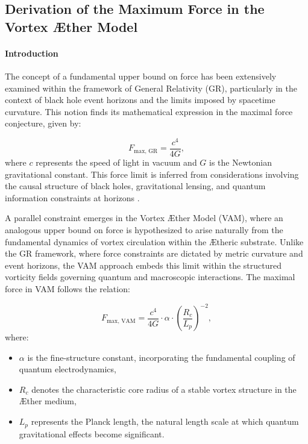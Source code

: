 
\subsection{Derivation of the Maximum Force in the Vortex \AE ther Model}

\paragraph*{Introduction}
The concept of a fundamental upper bound on force has been extensively examined within the framework of General Relativity (GR), particularly in the context of black hole event horizons and the limits imposed by spacetime curvature. This notion finds its mathematical expression in the maximal force conjecture, given by:


\begin{equation}
F_{\text{max, GR}} = \frac{c^4}{4G},
\end{equation}
where $c$ represents the speed of light in vacuum and $G$ is the Newtonian gravitational constant. This force limit is inferred from considerations involving the causal structure of black holes, gravitational lensing, and quantum information constraints at horizons \cite{Schiller2006}.


A parallel constraint emerges in the Vortex \AE ther Model (VAM), where an analogous upper bound on force is hypothesized to arise naturally from the fundamental dynamics of vortex circulation within the \AE theric substrate. Unlike the GR framework, where force constraints are dictated by metric curvature and event horizons, the VAM approach embeds this limit within the structured vorticity fields governing quantum and macroscopic interactions. The maximal force in VAM follows the relation:


\begin{equation}
F_{\text{max, VAM}} = \frac{c^4}{4G} \cdot \alpha \cdot \left(\frac{R_c}{L_p}\right)^{-2},
\end{equation}
where:
\begin{itemize}
\item $\alpha$ is the fine-structure constant, incorporating the fundamental coupling of quantum electrodynamics,
\item $R_c$ denotes the characteristic core radius of a stable vortex structure in the \AE ther medium,
\item $L_p$ represents the Planck length, the natural length scale at which quantum gravitational effects become significant.
\end{itemize}


